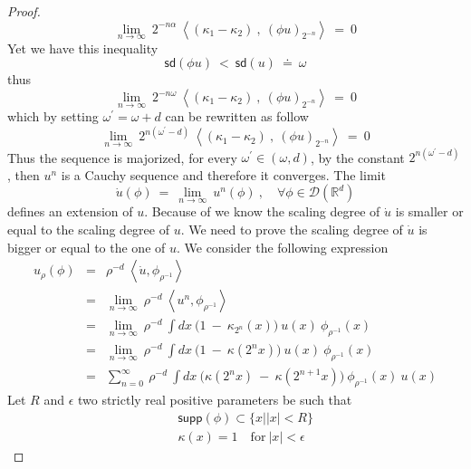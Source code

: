 \documentclass[10pt]{book}
\newcommand{\supp}{\mathsf{supp}}
\newcommand{\sd}{\mathsf{sd}}
\newcommand{\abs}[1]{\left|#1\right|}
\newcommand{\sm}[1]{\left\langle#1\right\rangle}
\let\int\int
\newcommand{\Dcal}{\mathcal{D}}
\newcommand{\Rbb}{\mathbb{R}}
\theoremstyle{break}
\begin{document}
\begin{proof}
\begin{equation*}
  \lim_{n \to \infty} \ 2^{-n\alpha} \ \sm{\left(\kappa_1 - \kappa_2\right) \ , \ (\phi u)_{2^{-n}}} \ = \ 0
 \end{equation*}
 Yet we have this inequality
 \begin{equation*}
  \sd(\phi u) \ < \ \sd(u) \ \doteq \ \omega %
 \end{equation*}
 thus
 \begin{equation*}
  \lim_{n \to \infty} \ 2^{-n\omega} \ \sm{\left(\kappa_1 - \kappa_2\right) \ , \ (\phi u)_{2^{-n}}} \ = \ 0
 \end{equation*}
 which by setting $\omega^\prime = \omega + d$ can be rewritten as follow
 \begin{equation*}
  \lim_{n \to \infty} \ 2^{n(\omega^\prime-d)} \ \sm{\left(\kappa_1 - \kappa_2\right) \ , \ (\phi u)_{2^{-n}}} \ = \ 0  
 \end{equation*}
 Thus the sequence is majorized, for every $\omega^\prime \in (\omega,d)$, by the constant $2^{n(\omega^\prime-d)}$, then $u^n$ is a Cauchy sequence and therefore it converges. The limit
 \begin{equation*}
  \dot{u}(\phi) \ = \ \lim_{n\to \infty} \ u^n(\phi) \ ,  \quad \forall \phi \in \Dcal(\Rbb^d)
 \end{equation*}
 defines an extension of $u$. Because of  we know the scaling degree of $\dot{u}$ is smaller or equal to the scaling degree of $u$. We need to prove the scaling degree of $\dot{u}$ is bigger or equal to the one of $u$. We consider the following expression
 \begin{eqnarray*}
  u_\rho(\phi) &=& \rho^{-d} \ \sm{\dot{u} , \phi_{\rho^{-1}}} \\
  &=& \lim_{n \to \infty} \ \rho^{-d} \ \sm{u^n , \phi_{\rho^{-1}}} \\
  &=& \lim_{n \to \infty} \ \rho^{-d} \ \int dx \ \bigg( 1 \ - \ \kappa_{2^n}(x) \bigg) \ u(x) \ \phi_{\rho^{-1}}(x) \\
  &=& \lim_{n \to \infty} \ \rho^{-d} \ \int dx \ \bigg( 1 \ - \ \kappa(2^n x) \bigg) \ u(x) \ \phi_{\rho^{-1}}(x) \\
  &=& \sum_{n=0}^{\infty} \ \rho^{-d} \ \int dx \ \bigg( \kappa(2^n x) \ - \ \kappa(2^{n+1} x) \bigg) \ \phi_{\rho^{-1}}(x) \ u(x) 
 \end{eqnarray*}
 Let $R$ and $\epsilon$ two strictly real positive parameters be such that 
 \begin{eqnarray*}
  && \supp(\phi) \subset \{ x | \abs{x} < R \} \\
  && \kappa(x) = 1 \quad \text{for} \ \abs{x} < \epsilon

\end{eqnarray*}
\end{proof}
\end{document}
